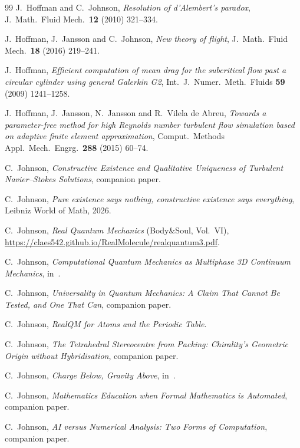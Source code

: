 \documentclass[11pt]{article}
\begin{document}
\begin{thebibliography}{99}
 J.~Hoffman and C.~Johnson, \emph{Resolution of d'Alembert's paradox},
J.\ Math.\ Fluid Mech.\ \textbf{12} (2010) 321--334.

 J.~Hoffman, J.~Jansson and C.~Johnson, \emph{New theory of flight},
J.\ Math.\ Fluid Mech.\ \textbf{18} (2016) 219--241.

 J.~Hoffman, \emph{Efficient computation of mean drag for the subcritical flow past a
circular cylinder using general Galerkin G2}, Int.\ J.\ Numer.\ Meth.\ Fluids \textbf{59} (2009)
1241--1258.

 J.~Hoffman, J.~Jansson, N.~Jansson and R.~Vilela de Abreu, \emph{Towards a
parameter-free method for high Reynolds number turbulent flow simulation based on adaptive finite
element approximation}, Comput.\ Methods Appl.\ Mech.\ Engrg.\ \textbf{288} (2015) 60--74.

 C.~Johnson, \emph{Constructive Existence and Qualitative Uniqueness of Turbulent
Navier--Stokes Solutions}, companion paper.

 C.~Johnson, \emph{Pure existence says nothing, constructive existence says
everything}, Leibniz World of Math, 2026.

 C.~Johnson, \emph{Real Quantum Mechanics} (Body\&Soul, Vol.~VI),
\url{https://claes542.github.io/RealMolecule/realquantum3.pdf}.

 C.~Johnson, \emph{Computational Quantum Mechanics as Multiphase 3D Continuum
Mechanics}, in~\cite{realqmbook}.

 C.~Johnson, \emph{Universality in Quantum Mechanics: A Claim That Cannot Be
Tested, and One That Can}, companion paper.

 C.~Johnson, \emph{RealQM for Atoms and the Periodic Table}.

 C.~Johnson, \emph{The Tetrahedral Stereocentre from Packing: Chirality's
Geometric Origin without Hybridisation}, companion paper.

 C.~Johnson, \emph{Charge Below, Gravity Above}, in~\cite{realqmbook}.

 C.~Johnson, \emph{Mathematics Education when Formal Mathematics is Automated},
companion paper.

 C.~Johnson, \emph{AI versus Numerical Analysis: Two Forms of Computation},
companion paper.

\end{thebibliography}
\end{document}
